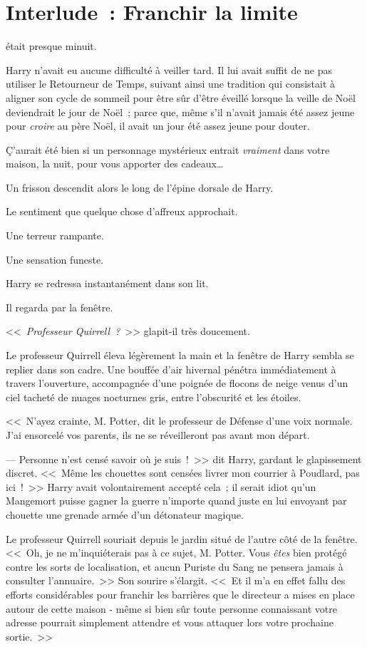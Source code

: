 \chapter{Interlude~: Franchir la limite}

 était presque minuit.

\hplettrineextrapara
Harry n'avait eu aucune difficulté à veiller tard. Il lui avait suffit de ne pas utiliser le Retourneur de Temps, suivant ainsi une tradition qui consistait à aligner son cycle de sommeil pour être sûr d'être éveillé lorsque la veille de Noël deviendrait le jour de Noël~; parce que, même s'il n'avait jamais été assez jeune pour \emph{croire} au père Noël, il avait un jour été assez jeune pour douter.

Ç'aurait été bien si un personnage mystérieux entrait \emph{vraiment} dans votre maison, la nuit, pour vous apporter des cadeaux…

Un frisson descendit alors le long de l'épine dorsale de Harry.

Le sentiment que quelque chose d'affreux approchait.

Une terreur rampante.

Une sensation funeste.

Harry se redressa instantanément dans son lit.

Il regarda par la fenêtre.

<<~\emph{Professeur Quirrell~?}~>> glapit-il très doucement.

Le professeur Quirrell éleva légèrement la main et la fenêtre de Harry sembla se replier dans son cadre. Une bouffée d'air hivernal pénétra immédiatement à travers l'ouverture, accompagnée d'une poignée de flocons de neige venus d'un ciel tacheté de nuages nocturnes gris, entre l'obscurité et les étoiles.

<<~N'ayez crainte, M. Potter, dit le professeur de Défense d'une voix normale. J'ai ensorcelé vos parents, ils ne se réveilleront pas avant mon départ.

--- Personne n'est censé savoir où je suis~!~>> dit Harry, gardant le glapissement discret. <<~Même les chouettes sont censées livrer mon courrier à Poudlard, pas ici~!~>> Harry avait volontairement accepté cela~; il serait idiot qu'un Mangemort puisse gagner la guerre n'importe quand juste en lui envoyant par chouette une grenade armée d'un détonateur magique.

Le professeur Quirrell souriait depuis le jardin situé de l'autre côté de la fenêtre. <<~Oh, je ne m'inquiéterais pas à ce sujet, M. Potter. Vous \emph{êtes} bien protégé contre les sorts de localisation, et aucun Puriste du Sang ne pensera jamais à consulter l'annuaire.~>> Son sourire s'élargit. <<~Et il m'a en effet fallu des efforts considérables pour franchir les barrières que le directeur a mises en place autour de cette maison - même si bien sûr toute personne connaissant votre adresse pourrait simplement attendre et vous attaquer lors votre prochaine sortie.~>>

